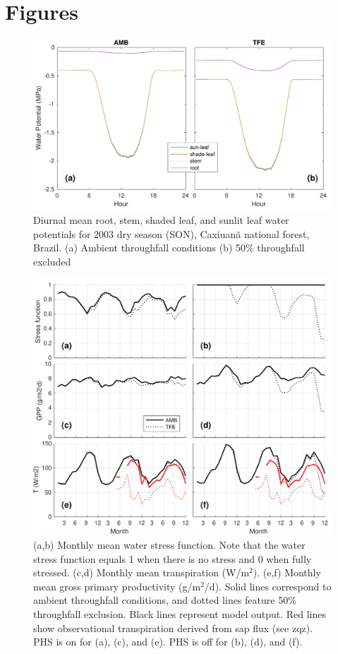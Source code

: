 \documentclass[draft,linenumbers]{agujournal}
\begin{document}
\section{Figures}
  \begin{figure}[h]
     \centering
     \includegraphics[width=30pc]{../figs/fig2.pdf}
     \caption{Diurnal mean root, stem, shaded leaf, and sunlit leaf water potentials for 2003 dry season (SON), Caxiuan\~a national forest, Brazil.
     (a) Ambient throughfall conditions (b) 50\% throughfall excluded
     }
     \label{fig2}
  \end{figure}
  
  \clearpage   
  \begin{figure}[h]
     \centering
     \includegraphics[width=30pc]{../figs/fig12.pdf}
     \caption{(a,b) Monthly mean water stress function. Note that the water stress function equals 1 when there is no stress and 0 when fully stressed.
     (c,d) Monthly mean transpiration (W/m$^2$).
     (e,f) Monthly mean gross primary productivity (g/m$^2$/d). 
     Solid lines correspond to ambient throughfall conditions, and dotted lines feature 50\% throughfall exclusion.
     Black lines represent model output.
     Red lines show observational transpiration derived from sap flux (see zqz).
     PHS is on for (a), (c), and (e). PHS is off for (b), (d), and (f).
     }
     \label{fig3}
  \end{figure}
  
\end{document}
